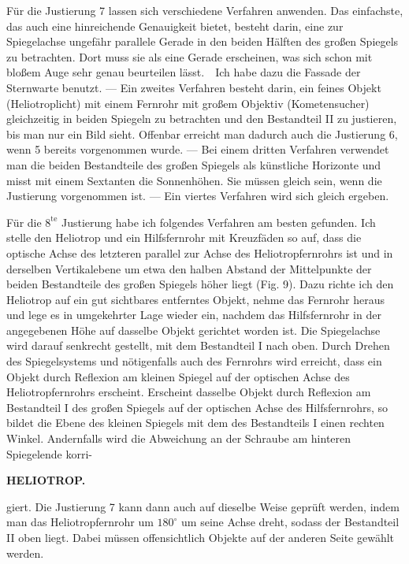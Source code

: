 \par\noindent\hspace*{\parindent}Für die Justierung 7 lassen sich verschiedene Verfahren anwenden. Das einfachste, das auch eine hinreichende Genauigkeit bietet, besteht darin, eine zur Spiegelachse ungefähr parallele Gerade in den beiden Hälften des großen Spiegels zu betrachten. Dort muss sie als eine Gerade erscheinen, was sich schon mit bloßem Auge sehr genau beurteilen lässt.\ \ Ich habe dazu die Fassade der Sternwarte benutzt. --- Ein zweites Verfahren besteht darin, ein feines Objekt (Heliotroplicht) mit einem Fernrohr mit großem Objektiv (Kometensucher) gleichzeitig in beiden Spiegeln zu betrachten und den Bestandteil II zu justieren, bis man nur ein Bild sieht. Offenbar erreicht man dadurch auch die Justierung 6, wenn 5 bereits vorgenommen wurde. --- Bei einem dritten Verfahren verwendet man die beiden Bestandteile des großen Spiegels als künstliche Horizonte und misst mit einem Sextanten die Sonnenhöhen. Sie müssen gleich sein, wenn die Justierung vorgenommen ist. --- Ein viertes Verfahren wird sich gleich ergeben.

\par\noindent\hspace*{\parindent}Für die $8^{\mathrm{te}}$ Justierung habe ich folgendes Verfahren am besten gefunden. Ich stelle den Heliotrop und ein Hilfsfernrohr mit Kreuzfäden so auf, dass die optische Achse des letzteren parallel zur Achse des Heliotropfernrohrs ist und in derselben Vertikalebene um etwa den halben Abstand der Mittelpunkte der beiden Bestandteile des großen Spiegels höher liegt (Fig. 9). Dazu richte ich den Heliotrop auf ein gut sichtbares entferntes Objekt, nehme das Fernrohr heraus und lege es in umgekehrter Lage wieder ein, nachdem das Hilfsfernrohr in der angegebenen Höhe auf dasselbe Objekt gerichtet worden ist. Die Spiegelachse wird darauf senkrecht gestellt, mit dem Bestandteil I nach oben. Durch Drehen des Spiegelsystems und nötigenfalls auch des Fernrohrs wird erreicht, dass ein Objekt durch Reflexion am kleinen Spiegel auf der optischen Achse des Heliotropfernrohrs erscheint. Erscheint dasselbe Objekt durch Reflexion am Bestandteil I des großen Spiegels auf der optischen Achse des Hilfsfernrohrs, so bildet die Ebene des kleinen Spiegels mit dem des Bestandteils I einen rechten Winkel. Andernfalls wird die Abweichung an der Schraube am hinteren Spiegelende korri-

\par\clearpage
\noindent\null\hfill{\small\textbf{HELIOTROP.}}\hfill{}\par\medskip
\noindent giert. Die Justierung 7 kann dann auch auf dieselbe Weise geprüft werden, indem man das Heliotropfernrohr um $180^\circ$ um seine Achse dreht, sodass der Bestandteil II oben liegt. Dabei müssen offensichtlich Objekte auf der anderen Seite gewählt werden.

